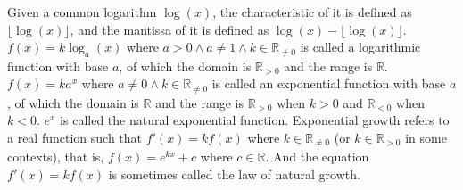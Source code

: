 \documentclass[a4paper,12pt]{article}
\begin{document}
Given a common logarithm $\log(x)$, the characteristic of it is defined as $\lfloor\log(x)\rfloor$, and the mantissa of it is defined as $\log(x)-\lfloor\log(x)\rfloor$.
$f(x)=k\log_a(x)$ where $a>0\land a\neq 1\land k\in\mathbb{R}_{\neq 0}$ is called a logarithmic function with base $a$, of which the domain is $\mathbb{R}_{>0}$ and the range is $\mathbb{R}$.
$f(x)=ka^x$ where $a\neq 0\land k\in\mathbb{R}_{\neq 0}$ is called an exponential function with base $a$, of which the domain is $\mathbb{R}$ and the range is $\mathbb{R}_{>0}$ when $k>0$ and $\mathbb{R}_{<0}$ when $k<0$.
$e^x$ is called the natural exponential function.
Exponential growth refers to a real function such that $f'(x)=kf(x)$ where $k\in\mathbb{R}_{\neq 0}$ (or $k\in\mathbb{R}_{>0}$ in some contexts), that is, $f(x)=e^{kx}+c$ where $c\in\mathbb{R}$. And the equation $f'(x)=kf(x)$ is sometimes called the law of natural growth.
\end{document}
